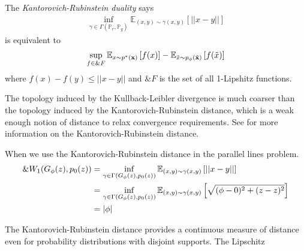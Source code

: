 \begin{theorem} The \textit{Kantorovich-Rubinstein duality} says
  \begin{align}
    \inf_{\gamma \in \Gamma(\mathbb{P}_r,
    \mathbb{P}_g)}\mathbb{E}_{(x,y) \sim \gamma(x, y)} \left[ || x-y
    || \right]
  \end{align}
  is equivalent to
  \begin{align} \sup_{f \in \&{F}} \mathbb{E}_{x \sim p^*(\mathbf{x})}\left[ f(x)
    \right] - \mathbb{E}_{\tilde{x} \sim p_{\phi}(\tilde{\mathbf{x}})}\left[ f(\tilde{x}) \right]
  \end{align}
  where $f(x) - f(y) \leq ||x-y||$ and $\&{F}$ is the set of all
  1-Lipshitz functions.
\end{theorem}

The topology induced by the Kullback-Leibler divergence is much
coarser than the topology induced by the Kantorovich-Rubinstein
distance, which is a weak enough notion of distance to relax
convergence requirements. See \cite{ref:villani-2008} for more
information on the Kantorovich-Rubinstein distance.

\begin{example}
  When we use the Kantorovich-Rubinstein distance in the parallel
  lines problem.
  \begin{align}
    \&W_1(G_\phi(z), p_0(z)) & = \inf_{\gamma \in
                           \Gamma(G_\phi(z),p_0(z))}\mathbb{E}_{(x,y) \sim
                           \gamma(x, y)} \left[ || x-y || \right] \\
                         & =\inf_{\gamma \in \Gamma(G_\phi(z),
                           p_0(z))}\mathbb{E}_{(x,y) \sim \gamma(x,
                           y)} \left[ \sqrt{(\phi - 0)^2 + (z - z)^2}
                           \right] \\
                         & =|\phi|
  \end{align}
\end{example}

The Kantorovich-Rubinstein distance provides a continuous measure of
distance even for probability distributions with disjoint supports.
The Lipschitz

